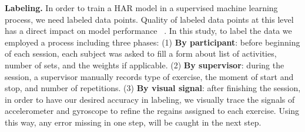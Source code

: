 \documentclass[journal,article,submit,moreauthors,pdftex]{Definitions/mdpi}
\begin{document}
\noindent \textbf{Labeling.} In order to train a HAR model in a supervised machine learning process, we need labeled data points. Quality of labeled data points at this level has a direct impact on model performance ~\cite{janidarmian2017comprehensive}. In this study, 
to label the data we employed a process including three phases: (1) \textbf{By participant}: before beginning of each session, each subject was asked to fill a form about list of activities, number of sets, and the weights if applicable. (2) \textbf{By supervisor}: during the session, a supervisor manually records type of exercise, the moment of start and stop, and number of repetitions. (3) \textbf{By visual signal}: after finishing the session, in order to have our desired accuracy in labeling, we visually trace the signals of accelerometer and gyroscope to refine the regains assigned to each exercise. Using this way, any error missing in one step, will be caught in the next step.
\end{document}
